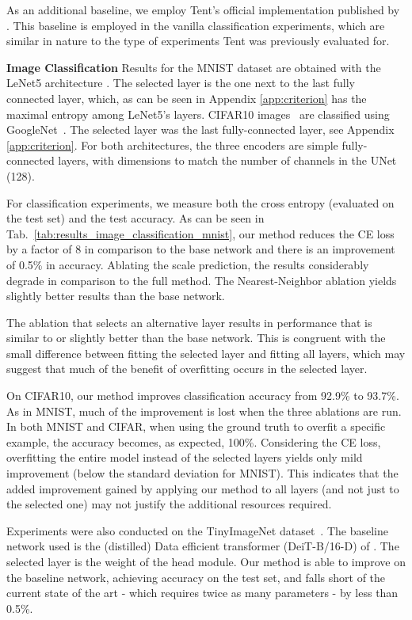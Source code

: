 \documentclass{article}
\theoremstyle{plain}
\begin{document}
As an additional baseline, we employ Tent's official implementation published by \citet{wang2021tent}. This baseline is employed in the vanilla classification experiments, which are similar in nature to the type of experiments Tent was previously evaluated for. 



{\bf Image Classification\quad} Results for the MNIST dataset \citep{mnist}  are obtained with the LeNet5 architecture \citep{lent5}. The selected layer is the one next to the last fully connected layer, which, as can be seen in Appendix \ref{app:criterion} has the maximal entropy among LeNet5's layers. CIFAR10 images~\citep{cifar} are classified using GoogleNet~\citep{googlenet}. The selected layer was the last fully-connected layer, see Appendix \ref{app:criterion}. 
For both architectures, the three encoders  are simple fully-connected layers, with dimensions to match the number of channels in the UNet (128). 

For classification experiments, we measure both the cross entropy (evaluated on the test set) and the test accuracy. As can be seen in Tab.~\ref{tab:results_image_classification_mnist}, our method reduces the CE loss by a factor of 8 in comparison to the base network and there is an improvement of 0.5\% in accuracy.  Ablating the scale prediction, the results considerably degrade in comparison to the full method. The Nearest-Neighbor ablation yields slightly better results than the base network. 

The ablation that selects an alternative layer results in performance that is similar to or slightly better than the base network. This is congruent with the small difference between fitting the selected layer and fitting all layers, which may suggest that much of the benefit of overfitting occurs in the selected layer.

On CIFAR10, our method improves classification accuracy from  92.9\% to 93.7\%. As in MNIST, much of the improvement is lost when the three ablations are run. 
In both MNIST and CIFAR, when using the ground truth to overfit a specific example, the accuracy becomes, as expected, 100\%. Considering the CE loss, overfitting the entire model instead of the selected layers yields only mild improvement (below the standard deviation for MNIST). This indicates that the added improvement gained by applying our method to all layers (and not just to the selected one) may not justify the additional resources required. 

Experiments were also conducted on the TinyImageNet dataset~\citep{le2015tiny}. The baseline network used is the (distilled) Data efficient transformer (DeiT-B/16-D) of \citet{touvron2022deit}. The selected layer is the weight of the head module. Our method is able to improve on the baseline network, achieving  accuracy on the test set, and falls short of the current state of the art - which requires twice as many parameters - by less than 0.5\%. 
\end{document}
